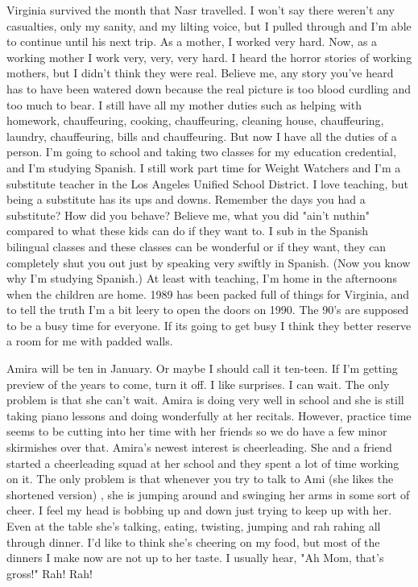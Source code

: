 Virginia survived the month that Nasr travelled. I won't say there weren't any casualties, only my sanity, and my lilting voice, but I pulled
through and I'm able to continue until his next trip. As a mother, I worked very hard. Now, as a working mother I work very, very, very hard. I
heard the horror stories of working mothers, but I didn't think they were real. Believe me, any story you've heard has to have been watered down
because the real picture is too blood curdling and too much to bear. I still have all my mother duties such as helping with homework,
chauffeuring, cooking, chauffeuring, cleaning house, chauffeuring, laundry, chauffeuring, bills and chauffeuring. But now I have all the duties
of a person. I'm going to school and taking two classes for my education credential, and I'm studying Spanish. I still work part time for Weight
Watchers and I'm a substitute teacher in the Los Angeles Unified School District. I love teaching, but being a substitute has its ups and downs.
Remember the days you had a substitute? How did you behave? Believe me, what you did "ain't nuthin" compared to what these kids can do if they
want to. I sub in the Spanish bilingual classes and these classes can be wonderful or if they want, they can completely shut you out just by
speaking very swiftly in Spanish. (Now you know why I'm studying Spanish.) At least with teaching, I'm home in the afternoons when the children
are home. 1989 has been packed full of things for Virginia, and to tell the truth I'm a bit leery to open the doors on 1990. The 90's are
supposed to be a busy time for everyone. If its going to get busy I think they better reserve a room for me with padded walls.

Amira will be ten in January. Or maybe I should call it ten-teen. If I'm getting preview of the years to come, turn it off. I like surprises. I
can wait. The only problem is that she can't wait. Amira is doing very well in school and she is still taking piano lessons and doing
wonderfully at her recitals. However, practice time seems to be cutting into her time with her friends so we do have a few minor skirmishes over
that. Amira's newest interest is cheerleading. She and a friend started a cheerleading squad at her school and they spent a lot of time working
on it. The only problem is that whenever you try to talk to Ami (she likes the shortened version) , she is jumping around and swinging her arms
in some sort of cheer. I feel my head is bobbing up and down just trying to keep up with her. Even at the table she's talking, eating, twisting,
jumping and rah rahing all through dinner. I'd like to think she's cheering on my food, but most of the dinners I make now are not up to her
taste. I usually hear, "Ah Mom, that's gross!" Rah! Rah!

